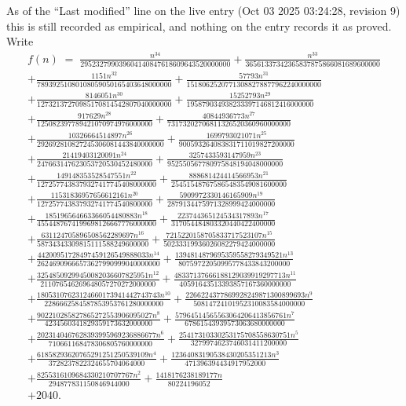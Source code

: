 \documentclass[11pt,a4paper]{article}
\theoremstyle{plain}
\theoremstyle{definition}
\begin{document}
As of the ``Last modified'' line on the live entry (Oct 03 2025 03:24:28, revision 9) this is still
recorded as empirical, and nothing on the entry records it as proved. Write
\begin{multline*}
f(n)\;=\;\frac{n^{34}}{295232799039604140847618609643520000000} + \frac{n^{33}}{36561337342365837875866081689600000} \\
+ \frac{1151 n^{32}}{78939251080108059050165403648000000} + \frac{57793 n^{31}}{15180625207713088278877962240000000} \\
+ \frac{8146051 n^{30}}{12732137270985170814542807040000000} + \frac{15252793 n^{29}}{195879034938233397146812416000000} \\
+ \frac{917629 n^{28}}{125082397789421070974976000000} + \frac{40844936773 n^{27}}{73173202706811326520360960000000} \\
+ \frac{10326664514897 n^{26}}{292692810827245306081443840000000} + \frac{1699793021071 n^{25}}{900593264083831711019827200000} \\
+ \frac{21419403120091 n^{24}}{247663147623053720530452480000} + \frac{3257433593147959 n^{23}}{952550567780975848194048000000} \\
+ \frac{149148353528547551 n^{22}}{1272577438379327417745408000000} + \frac{888681424414566953 n^{21}}{254515487675865483549081600000} \\
+ \frac{11531836957656612161 n^{20}}{127257743837932741774540800000} + \frac{5909972330146165909 n^{19}}{2879134475971328999424000000} \\
+ \frac{185196564663366054480883 n^{18}}{4554487674199698126667776000000} + \frac{223744365124534317893 n^{17}}{317054484803320440422400000} \\
+ \frac{631124705896508562289697 n^{16}}{58734343309815111588249600000} + \frac{7215220158705833717523107 n^{15}}{50233319936026082279424000000} \\
+ \frac{44200951728497459126549888033 n^{14}}{26246909666573627990999040000000} + \frac{1394814879695359558279349521 n^{13}}{80759722050995778433843200000} \\
+ \frac{32548509299450082036607825951 n^{12}}{211076546269648057270272000000} + \frac{48337137666188129039919297713 n^{11}}{40591643513393857167360000000} \\
+ \frac{18053107623124660173941442743743 n^{10}}{2286662584587853953761280000000} + \frac{2266224377869928249871300899693 n^{9}}{50814724101952310083584000000} \\
+ \frac{902210285827865272553906095027 n^{8}}{4234560341829359173632000000} + \frac{57964514565563064206413856761 n^{7}}{67861543939573063680000000} \\
+ \frac{2023140467628393995969236886677 n^{6}}{710661168478306805760000000} + \frac{25417310330253175708558630751 n^{5}}{3279974623746031411200000} \\
+ \frac{61858293620765291251250539109 n^{4}}{3728237822324655704064000} + \frac{12364083190538430205351213 n^{3}}{471396394434917952000} \\
+ \frac{8255316109684330210707767 n^{2}}{294877831150846944000} + \frac{1418176238189177 n}{80224196052} \\
+ 2040.
\end{multline*}
\end{document}
